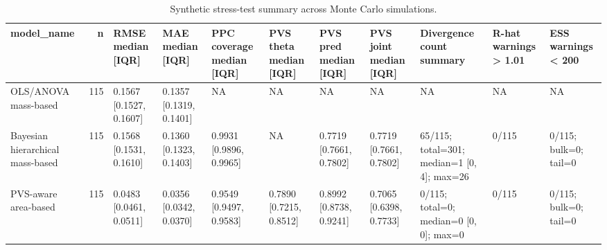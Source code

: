 \begin{table}
\caption{Synthetic stress-test summary across Monte Carlo simulations.}
\label{tab:table_stress_test_summary_clean_pvs}
\begin{tabular}{lrlllllllll}
\toprule
model\_name & n & RMSE median [IQR] & MAE median [IQR] & PPC coverage median [IQR] & PVS theta median [IQR] & PVS pred median [IQR] & PVS joint median [IQR] & Divergence count summary & R-hat warnings > 1.01 & ESS warnings < 200 \\
\midrule
OLS/ANOVA mass-based & 115 & 0.1567 [0.1527, 0.1607] & 0.1357 [0.1319, 0.1401] & NA & NA & NA & NA & NA & NA & NA \\
Bayesian hierarchical mass-based & 115 & 0.1568 [0.1531, 0.1610] & 0.1360 [0.1323, 0.1403] & 0.9931 [0.9896, 0.9965] & NA & 0.7719 [0.7661, 0.7802] & 0.7719 [0.7661, 0.7802] & 65/115; total=301; median=1 [0, 4]; max=26 & 0/115 & 0/115; bulk=0; tail=0 \\
PVS-aware area-based & 115 & 0.0483 [0.0461, 0.0511] & 0.0356 [0.0342, 0.0370] & 0.9549 [0.9497, 0.9583] & 0.7890 [0.7215, 0.8512] & 0.8992 [0.8738, 0.9241] & 0.7065 [0.6398, 0.7733] & 0/115; total=0; median=0 [0, 0]; max=0 & 0/115 & 0/115; bulk=0; tail=0 \\
\bottomrule
\end{tabular}
\end{table}
